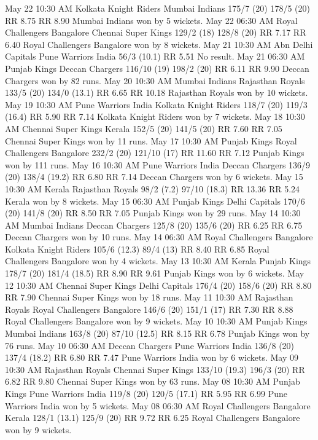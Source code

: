 May 22
10:30 AM
Kolkata Knight Riders
Mumbai Indians
175/7 (20)
178/5 (20)
RR 8.75
RR 8.90
Mumbai Indians won by 5 wickets.
May 22
06:30 AM
Royal Challengers Bangalore
Chennai Super Kings
129/2 (18)
128/8 (20)
RR 7.17
RR 6.40
Royal Challengers Bangalore won by 8 wickets.
May 21
10:30 AM
Abn
Delhi Capitals
Pune Warriors India
56/3 (10.1)
RR 5.51
No result.
May 21
06:30 AM
Punjab Kings
Deccan Chargers
116/10 (19)
198/2 (20)
RR 6.11
RR 9.90
Deccan Chargers won by 82 runs.
May 20
10:30 AM
Mumbai Indians
Rajasthan Royals
133/5 (20)
134/0 (13.1)
RR 6.65
RR 10.18
Rajasthan Royals won by 10 wickets.
May 19
10:30 AM
Pune Warriors India
Kolkata Knight Riders
118/7 (20)
119/3 (16.4)
RR 5.90
RR 7.14
Kolkata Knight Riders won by 7 wickets.
May 18
10:30 AM
Chennai Super Kings
Kerala
152/5 (20)
141/5 (20)
RR 7.60
RR 7.05
Chennai Super Kings won by 11 runs.
May 17
10:30 AM
Punjab Kings
Royal Challengers Bangalore
232/2 (20)
121/10 (17)
RR 11.60
RR 7.12
Punjab Kings won by 111 runs.
May 16
10:30 AM
Pune Warriors India
Deccan Chargers
136/9 (20)
138/4 (19.2)
RR 6.80
RR 7.14
Deccan Chargers won by 6 wickets.
May 15
10:30 AM
Kerala
Rajasthan Royals
98/2 (7.2)
97/10 (18.3)
RR 13.36
RR 5.24
Kerala won by 8 wickets.
May 15
06:30 AM
Punjab Kings
Delhi Capitals
170/6 (20)
141/8 (20)
RR 8.50
RR 7.05
Punjab Kings won by 29 runs.
May 14
10:30 AM
Mumbai Indians
Deccan Chargers
125/8 (20)
135/6 (20)
RR 6.25
RR 6.75
Deccan Chargers won by 10 runs.
May 14
06:30 AM
Royal Challengers Bangalore
Kolkata Knight Riders
105/6 (12.3)
89/4 (13)
RR 8.40
RR 6.85
Royal Challengers Bangalore won by 4 wickets.
May 13
10:30 AM
Kerala
Punjab Kings
178/7 (20)
181/4 (18.5)
RR 8.90
RR 9.61
Punjab Kings won by 6 wickets.
May 12
10:30 AM
Chennai Super Kings
Delhi Capitals
176/4 (20)
158/6 (20)
RR 8.80
RR 7.90
Chennai Super Kings won by 18 runs.
May 11
10:30 AM
Rajasthan Royals
Royal Challengers Bangalore
146/6 (20)
151/1 (17)
RR 7.30
RR 8.88
Royal Challengers Bangalore won by 9 wickets.
May 10
10:30 AM
Punjab Kings
Mumbai Indians
163/8 (20)
87/10 (12.5)
RR 8.15
RR 6.78
Punjab Kings won by 76 runs.
May 10
06:30 AM
Deccan Chargers
Pune Warriors India
136/8 (20)
137/4 (18.2)
RR 6.80
RR 7.47
Pune Warriors India won by 6 wickets.
May 09
10:30 AM
Rajasthan Royals
Chennai Super Kings
133/10 (19.3)
196/3 (20)
RR 6.82
RR 9.80
Chennai Super Kings won by 63 runs.
May 08
10:30 AM
Punjab Kings
Pune Warriors India
119/8 (20)
120/5 (17.1)
RR 5.95
RR 6.99
Pune Warriors India won by 5 wickets.
May 08
06:30 AM
Royal Challengers Bangalore
Kerala
128/1 (13.1)
125/9 (20)
RR 9.72
RR 6.25
Royal Challengers Bangalore won by 9 wickets.
